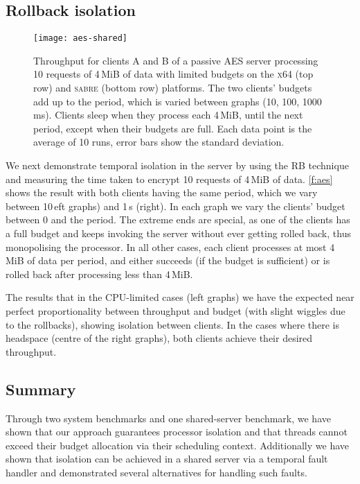 \subsection{Rollback isolation}


\begin{figure*}[t]
  \centering
  \texttt{[image: aes-shared]}
  \caption{Throughput for clients A and B of a passive AES server processing 10 requests of 4\,MiB of data with
      limited budgets on the \textsc{x64} (top row) and \textsc{sabre} (bottom row) platforms. The two clients' budgets
      add up to the period, which is varied between graphs (10, 100, 1000\,ms). Clients sleep when
      they process each 4\,MiB, until the next period, except when their budgets are full. Each data point is the average of 10 runs, error bars show the standard deviation.}
  \label{f:aes}
\end{figure*}



We next demonstrate temporal isolation in the server by using the RB
technique and measuring the time taken to encrypt 10 requests of 4\,MiB of
data. \autoref{f:aes} shows the result with both clients having the same
period, which we vary between 10\,eft graphs) and 1\,s
(right). In each graph  we vary the clients' budget between 0 and the
period. The extreme ends are special, as one of the clients has a full
budget and keeps invoking the server without ever getting rolled back,
thus monopolising the processor. In all other cases, each client
processes at most 4\,MiB of data per period, and either succeeds (if
the budget is sufficient) or is rolled back after processing less than 4\,MiB.

The results that in the CPU-limited cases (left graphs)
we have the expected near perfect proportionality between throughput and
budget (with slight wiggles due to the rollbacks), showing isolation between clients. In the cases where there is headspace (centre of the right
graphs), both clients achieve their desired throughput.

\subsection{Summary}

Through two system benchmarks and one shared-server benchmark, we have shown that our approach
guarantees processor isolation and that threads cannot exceed their budget allocation via their
scheduling context. Additionally we have shown that isolation can be achieved in a shared server via
a temporal fault handler and demonstrated several alternatives for handling such faults.

